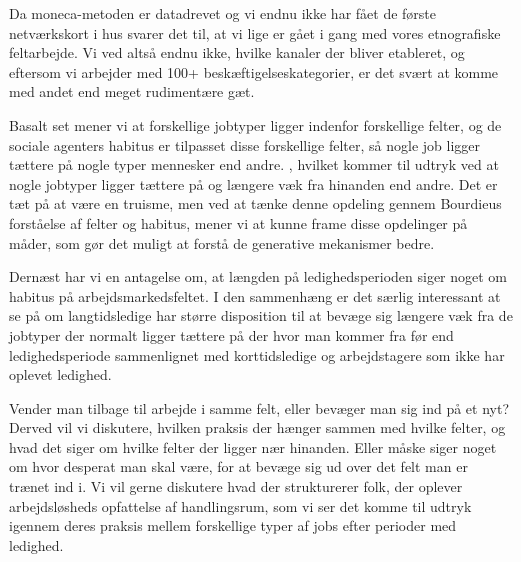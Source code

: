 Da moneca-metoden er datadrevet og vi endnu ikke har fået de første netværkskort i hus svarer det til, at vi lige er gået i gang med vores etnografiske feltarbejde. Vi ved altså endnu ikke, hvilke kanaler der bliver etableret, og eftersom vi arbejder med 100+ beskæftigelseskategorier, er det svært at komme med andet end meget rudimentære gæt.

Basalt set mener vi at forskellige jobtyper ligger indenfor forskellige felter, og de sociale agenters habitus er tilpasset disse forskellige felter, så nogle job ligger tættere på nogle typer mennesker end andre. , hvilket kommer til udtryk ved at nogle jobtyper ligger tættere på og længere væk fra hinanden end andre. Det er tæt på at være en truisme, men ved at tænke denne opdeling gennem Bourdieus forståelse af felter og habitus, mener vi at kunne frame disse opdelinger på måder, som gør det muligt at forstå de generative mekanismer bedre. 

Dernæst har vi en antagelse om, at længden på ledighedsperioden siger noget om habitus på arbejdsmarkedsfeltet. I den sammenhæng er det særlig interessant at se på om langtidsledige har større disposition til at bevæge sig længere væk fra de jobtyper der normalt ligger tættere på der hvor man kommer fra før end ledighedsperiode sammenlignet med korttidsledige og arbejdstagere som ikke har oplevet ledighed.

Vender man tilbage til arbejde i samme felt, eller bevæger man sig ind på et nyt? Derved vil vi diskutere, hvilken praksis der hænger sammen med hvilke felter, og hvad det siger om hvilke felter der ligger nær hinanden. Eller måske siger noget om hvor desperat man skal være, for at bevæge sig ud over det felt man er trænet ind i. Vi vil gerne diskutere hvad der strukturerer folk, der oplever arbejdsløsheds opfattelse af handlingsrum, som vi ser det komme til udtryk igennem deres praksis mellem forskellige typer af jobs efter perioder med ledighed.


